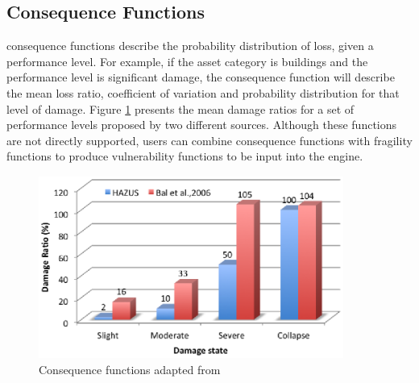 \subsection{Consequence Functions}
\Glspl{consequence function} describe the probability distribution of loss, given a performance level. For example, if the asset category is buildings and the performance level is significant damage, the \gls{consequence function} will describe the mean loss ratio, coefficient of variation and probability distribution for that level of damage. Figure \ref{fig:ConsequenceFunctions} presents the mean damage ratios for a set of performance levels proposed by two different sources. Although these functions are not directly supported, users can combine \glspl{consequence function} with \glspl{fragility function} to produce \glspl{vulnerability function} to be input into the engine.  

\begin{figure}[Ht]
\centering
\includegraphics[width=10cm,height=6cm]{./figures/risk/ConsequenceFunction.eps}
\caption{Consequence functions adapted from  \citet{Baletal2010}}
\label{fig:ConsequenceFunctions}
\end{figure}
\color{black}
